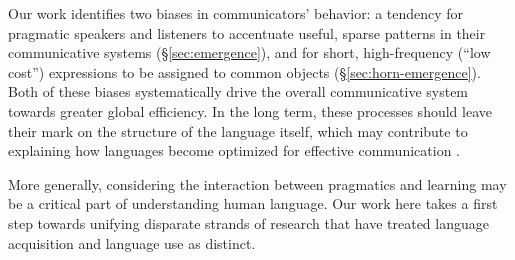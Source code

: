 \documentclass{article} %
\begin{document}
Our work identifies two biases in communicators' behavior: a tendency for pragmatic speakers
and listeners to accentuate useful, sparse patterns in their
communicative systems (\S\ref{sec:emergence}), and for short,
high-frequency (``low cost'') expressions to
be assigned to common objects (\S\ref{sec:horn-emergence}).
Both of these biases systematically drive the overall communicative system
towards greater global efficiency. In the long term, these processes
should leave their mark on the structure of the language itself, which
may contribute to explaining how languages become 
optimized for effective communication \cite{zipf1936,piantadosi2011}.

More generally, considering the interaction between pragmatics and learning may be a critical part of understanding human language. Our work here takes a first step towards unifying disparate strands of research that have treated language acquisition and language use as distinct. 








\newpage
\small


\end{document}
